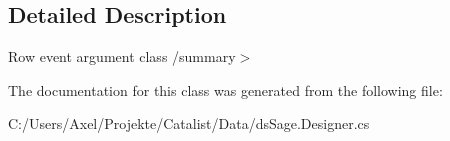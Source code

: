 \subsection{Detailed Description}
Row event argument class /summary$>$ 

The documentation for this class was generated from the following file\+:\begin{DoxyCompactItemize}
\item 
C\+:/\+Users/\+Axel/\+Projekte/\+Catalist/\+Data/ds\+Sage.\+Designer.\+cs\end{DoxyCompactItemize}
